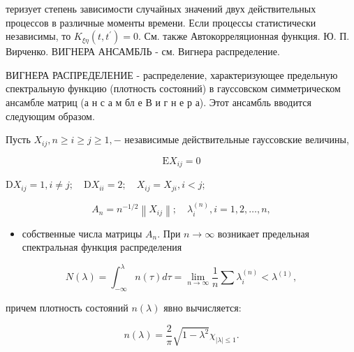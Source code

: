 \documentclass[10pt]{article}
\begin{document}
теризует степень зависимости случайных значений двух действительных процессов в различные моменты времени. Если процессы статистически независимы, то $K_{\xi \eta}\left(t, t^{\prime}\right)=0$. См. также Автокорреляционная функция. Ю. П. Вирченко. ВИГНЕРА АНСАМБЛЬ - см. Вигнера распределение.



ВИГНЕРА РАСПРЕДЕЛЕНИЕ - распределение, характеризующее предельную спектральную функцию (плотность состояний) в гауссовском симметрическом ансамбле матриц (а н с а м бл е В и г н е р а). Этот ансамбль вводится следующим образом.



Пусть $X_{i j}, n \geqslant i \geqslant j \geqslant 1,-$ независимые действительные гауссовские величины,



\[

\mathrm{E} X_{i j}=0

\]



$\mathrm{D} X_{i j}=1, i \neq j ; \quad \mathrm{D} X_{i i}=2 ; \quad X_{i j}=X_{j i}, i<j ;$



\[

A_{n}=n^{-1 / 2}\left\|X_{i j}\right\| ; \quad \lambda_{i}^{(n)}, i=1,2, \ldots, n,

\]



\begin{itemize}

  \item собственные числа матрицы $A_{n}$. При $n \rightarrow \infty$ возникает предельная спектральная функция распределения

\end{itemize}



\[

N(\lambda)=\int_{-\infty}^{\lambda} n(\tau) d \tau=\lim _{n \rightarrow \infty} \frac{1}{n} \sum \lambda_{i}^{(n)}<\lambda^{(1)},

\]



причем плотность состояний $n(\lambda)$ явно вычисляется:



\[

n(\lambda)=\frac{2}{\pi} \sqrt{1-\lambda^{2}} \chi_{|\lambda| \leqslant 1} .

\]
\end{document}
